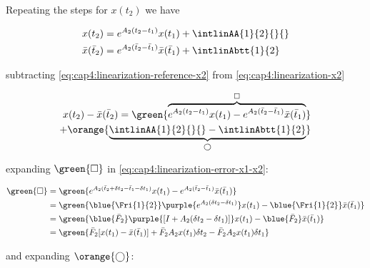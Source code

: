 
Repeating the steps for $x(t_2)$ we have


\noindent
\begin{align}
	\label{eq:cap4:linearization-x2}
	x(t_2)  &= e^{A_2(t_2-t_1)}x(t_1) + \intlinAA{1}{2}{}{} \\
	\label{eq:cap4:linearization-reference-x2}
	\bar{x}(\bar{t}_2) &= e^{A_2(\bar{t}_2-\bar{t}_1)}\bar{x}(\bar{t}_1) + \intlinAbtt{1}{2}
\end{align}

\noindent 
subtracting \eqref{eq:cap4:linearization-reference-x2} from \eqref{eq:cap4:linearization-x2} 

\begin{equation}
	\label{eq:cap4:linearization-error-x1-x2}
	\begin{split}
		x(t_2) - \bar{x}(\bar{t}_2) = 
		\green{\overbrace{e^{A_2(t_2-t_1)}x(t_1) - e^{A_2(\bar{t}_2-\bar{t}_1)}\bar{x}(\bar{t}_1)}^{\square}} \\ 
		+ \orange{\underbrace{\intlinAA{1}{2}{}{} - \intlinAbtt{1}{2}}_{\bigcirc}}
	\end{split}
\end{equation}

\noindent 
expanding $\green{\square}$ in \eqref{eq:cap4:linearization-error-x1-x2}:

\noindent
\begin{align}
	\green{ \square } &=
	\green{
		e^{A_2(\bar{t}_2 + \delta t_2 - \bar{t}_1 - \delta t_1)} x(t_1)
		- e^{A_2(\bar{t}_2 - \bar{t}_1)} \bar{x}(\bar{t}_1)
	} \nonumber \\
	&= \green{
		\blue{\Fri{1}{2}} \purple{e^{A_2(\delta t_2 - \delta t_1)}} x(t_1)
		- \blue{\Fri{1}{2}} \bar{x}(\bar{t}_1)
	} \nonumber \\
	&= \green{
		\blue{\bar{F}_2} \purple{[I + A_2(\delta t_2 - \delta t_1)]} x(t_1)
		- \blue{\bar{F}_2} \bar{x}(\bar{t}_1)
	} \nonumber \\
	\label{eq:cap4:linearization-x2-green-term}
	&= \green{
		\bar{F}_2 [x(t_1) - \bar{x}(\bar{t}_1)] + \bar{F}_2 A_2 x(t_1) \delta t_2
		- \bar{F}_2 A_2 x(t_1) \delta t_1
	}
\end{align}

\noindent 
and expanding $\orange{\bigcirc}$:

